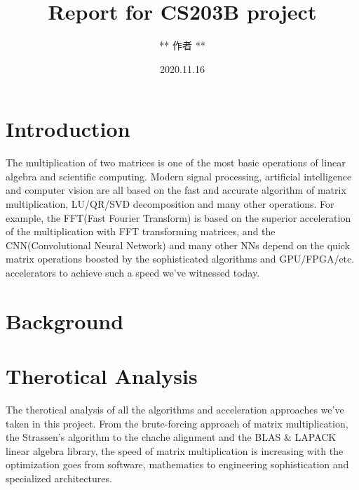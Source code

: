 \documentclass[UTF8]{ctexart}
\begin{document}
\title{\textbf{Report for CS203B project}}
\author{** 作者 **}
\date{2020.11.16}
\maketitle
\tableofcontents

\section{Introduction}
\label{sec::Intro}
The multiplication of two matrices is one of the most basic operations of linear algebra and scientific computing. Modern signal processing, artificial intelligence and computer vision are all based on the fast and accurate algorithm of matrix multiplication, LU/QR/SVD decomposition and many other operations. For example, the FFT(Fast Fourier Transform) is based on the superior acceleration of the multiplication with FFT transforming matrices, and the CNN(Convolutional Neural Network) and many other NNs depend on the quick matrix operations boosted by the sophisticated algorithms and GPU/FPGA/etc. accelerators to achieve such a speed we've witnessed today.

\section{Background}
\label{sec::bgnd}

\section{Therotical Analysis}
\label{sec::TA}

The therotical analysis of all the algorithms and acceleration approaches we've taken in this project. From the brute-forcing approach of matrix multiplication, the Strassen's algorithm to the chache alignment and the BLAS \& LAPACK linear algebra library, the speed of matrix multiplication is increasing with the optimization goes from software, mathematics to engineering sophistication and specialized architectures.
\end{document}
